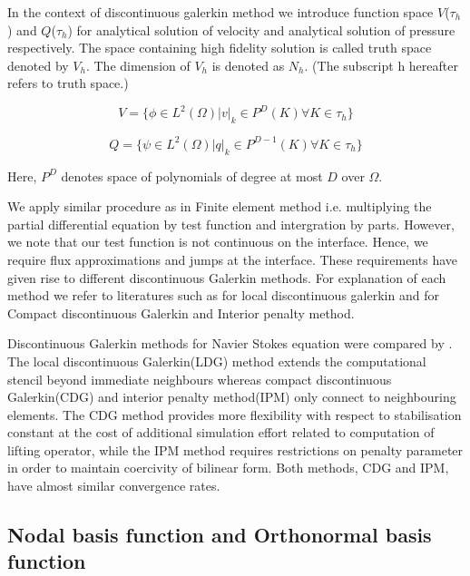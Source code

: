 \documentclass[a4paper,12pt]{book}
\begin{document}
In the context of discontinuous galerkin method we introduce function space $V$($\tau_h$) and $Q$($\tau_h$) for analytical solution of velocity and analytical solution of pressure respectively. The space containing high fidelity solution is called truth space denoted by $V_h$. The dimension of $V_h$ is denoted as $N_h$. (The subscript h hereafter refers to truth space.)

\begin{equation} \label{velocity_test}
V = \lbrace \phi \in L^2(\Omega)| v|_k \in P^D(K) \forall K \in \tau_h \rbrace
\end{equation}

\begin{equation} \label{pressure_test}
Q = \lbrace \psi \in L^2(\Omega)| q|_k \in P^{D-1}(K) \forall K \in \tau_h \rbrace
\end{equation}

Here, $P^D$ denotes space of polynomials of degree at most $D$ over $\Omega$.

We apply similar procedure as in Finite element method i.e. multiplying the partial differential equation by test function and intergration by parts. However, we note that our test function is not continuous on the interface. Hence, we require flux approximations and jumps at the interface. These requirements have given rise to different discontinuous Galerkin methods. For explanation of each method we refer to literatures such as \cite{persson} for local discontinuous galerkin and \cite{Montlaur} for Compact discontinuous Galerkin and Interior penalty method. 

Discontinuous Galerkin methods for Navier Stokes equation were compared by \cite{Montlaur}. The local discontinuous Galerkin(LDG) method extends the computational stencil beyond immediate neighbours whereas compact discontinuous Galerkin(CDG) and interior penalty method(IPM) only connect to neighbouring elements. The CDG method provides more flexibility with respect to stabilisation constant at the cost of additional simulation effort related to computation of lifting operator, while the IPM method requires restrictions on penalty parameter in order to maintain coercivity of bilinear form. Both methods, CDG and IPM, have almost similar convergence rates. 

\subsection{Nodal basis function and Orthonormal basis function}
\end{document}
